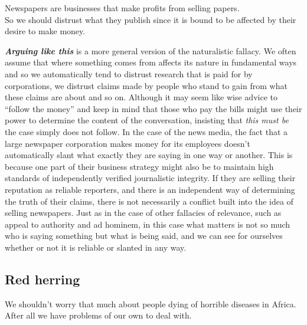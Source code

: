 \documentclass[
  12pt, openany]{book}
\theoremstyle{definition}
\theoremstyle{definition}
\theoremstyle{definition}
\theoremstyle{remark}
\begin{document}
\begin{center}

\begin{argument}

Newspapers are businesses that make profits from selling papers.\\

So we should distrust what they publish since it is bound to be affected by their desire to make money.

\end{argument}

\end{center}

\textbf{\emph{Arguing like this}} is a more general version of the naturalistic fallacy. We often assume that where something comes from affects its nature in fundamental ways and so we automatically tend to distrust research that is paid for by corporations, we distrust claims made by people who stand to gain from what these claims are about and so on. Although it may seem like wise advice to ``follow the money'' and keep in mind that those who pay the bills might use their power to determine the content of the conversation, insisting that \emph{this must be} the case simply does not follow. In the case of the news media, the fact that a large newspaper corporation makes money for its employees doesn't automatically slant what exactly they are saying in one way or another. This is because one part of their business strategy might also be to maintain high standards of independently verified journalistic integrity. If they are selling their reputation as reliable reporters, and there is an independent way of determining the truth of their claims, there is not necessarily a conflict built into the idea of selling newspapers. Just as in the case of other fallacies of relevance, such as appeal to authority and ad hominem, in this case what matters is not so much who is saying something but what is being said, and we can see for ourselves whether or not it is reliable or slanted in any way.

\hypertarget{red-herring}{%
\subsection*{Red herring}\label{red-herring}}


\begin{center}

\begin{argument}

We shouldn't worry that much about people dying of horrible diseases in Africa.\\

After all we have problems of our own to deal with.

\end{argument}

\end{center}
\end{document}
